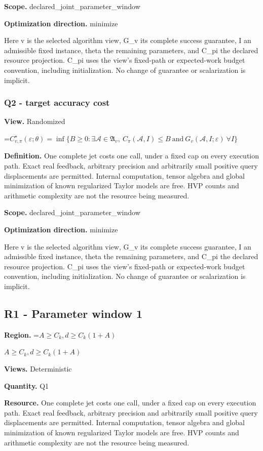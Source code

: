 \documentclass[10pt,a4paper]{article}
\newcommand{\AtlasMath}[1]{\par\begingroup\centering\setbox0=\hbox{$\displaystyle #1$}\ifdim\wd0>1.4\linewidth\typeout{ATLAS WIDE FORMULA: \the\wd0}\fi\ifdim\wd0>\linewidth\resizebox{\linewidth}{!}{\box0}\else\box0\fi\par\endgroup}
\newcommand{\AtlasInlineMath}[1]{\begingroup\setbox0=\hbox{$#1$}\ifdim\wd0>.4\linewidth\endgroup\AtlasMath{#1}\else\endgroup$#1$\fi}
\begin{document}
\textbf{Scope.} declared\_joint\_parameter\_window

\textbf{Optimization direction.} minimize

Here v is the selected algorithm view, G\_v its complete success guarantee, I an admissible fixed instance, theta the remaining parameters, and C\_pi the declared resource projection. C\_pi uses the view's fixed-path or expected-work budget convention, including initialization. No change of guarantee or scalarization is implicit.

\subsubsection{Q2 - target accuracy cost}
\textbf{View.} Randomized

\AtlasMath{C^\star_{v,\pi}(\varepsilon;\theta)=\inf\{B\ge0:\exists\mathcal A\in\mathfrak A_v,\ C_\pi(\mathcal A,I)\le B\ \text{and}\ G_v(\mathcal A,I;\varepsilon)\ \forall I\}}
\textbf{Definition.} One complete jet costs one call, under a fixed cap on every execution path. Exact real feedback, arbitrary precision and arbitrarily small positive query displacements are permitted. Internal computation, tensor algebra and global minimization of known regularized Taylor models are free. HVP counts and arithmetic complexity are not the resource being measured.

\textbf{Scope.} declared\_joint\_parameter\_window

\textbf{Optimization direction.} minimize

Here v is the selected algorithm view, G\_v its complete success guarantee, I an admissible fixed instance, theta the remaining parameters, and C\_pi the declared resource projection. C\_pi uses the view's fixed-path or expected-work budget convention, including initialization. No change of guarantee or scalarization is implicit.

\subsection{R1 - Parameter window 1}
\textbf{Region.} \AtlasInlineMath{A\ge C_k, d\ge C_k(1+A)}

\textbf{Views.} Deterministic

\textbf{Quantity.} Q1

\textbf{Resource.} One complete jet costs one call, under a fixed cap on every execution path. Exact real feedback, arbitrary precision and arbitrarily small positive query displacements are permitted. Internal computation, tensor algebra and global minimization of known regularized Taylor models are free. HVP counts and arithmetic complexity are not the resource being measured.
\end{document}
